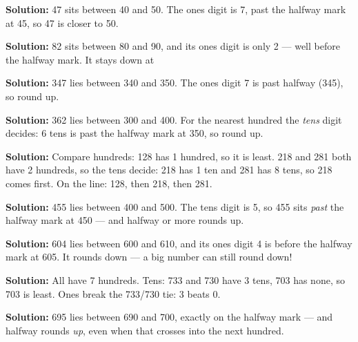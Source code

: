 \documentclass[12pt]{article}
\begin{document}



\textbf{Solution:} 47 sits between 40 and 50. The ones digit is 7, past the
halfway mark at 45, so 47 is closer to 50. 


\textbf{Solution:} 82 sits between 80 and 90, and its ones digit is only 2
--- well before the halfway mark. It stays down at 


\textbf{Solution:} 347 lies between 340 and 350. The ones digit 7 is past
halfway (345), so round up. 


\textbf{Solution:} 362 lies between 300 and 400. For the nearest hundred the
\emph{tens} digit decides: 6 tens is past the halfway mark at 350, so round
up. 


\textbf{Solution:} Compare hundreds: 128 has 1 hundred, so it is least. 218
and 281 both have 2 hundreds, so the tens decide: 218 has 1 ten and 281 has
8 tens, so 218 comes first. On the line: 128, then 218, then 281.


\textbf{Solution:} 455 lies between 400 and 500. The tens digit is 5, so 455
sits \emph{past} the halfway mark at 450 --- and halfway or more rounds up.


\textbf{Solution:} 604 lies between 600 and 610, and its ones digit 4 is
before the halfway mark at 605. It rounds down --- a big number can still
round down! 


\textbf{Solution:} All have 7 hundreds. Tens: 733 and 730 have 3 tens, 703
has none, so 703 is least. Ones break the 733/730 tie: 3 beats 0.


\textbf{Solution:} 695 lies between 690 and 700, exactly on the halfway
mark --- and halfway rounds \emph{up}, even when that crosses into the next
hundred. 
\end{document}
